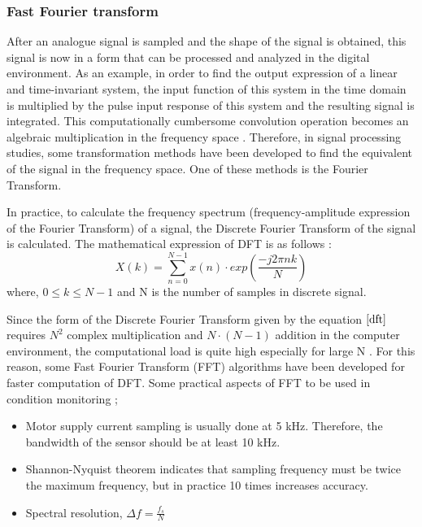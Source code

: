 \subsubsection{Fast Fourier transform}

After an analogue signal is sampled and the shape of the signal is obtained, this signal is now in a form that can be processed and analyzed in the digital environment. As an example, in order to find the output expression of a linear and time-invariant system, the input function of this system in the time domain is multiplied by the pulse input response of this system and the resulting signal is integrated. This computationally cumbersome convolution operation becomes an algebraic multiplication in the frequency space \cite{cernuda2019relevance}. Therefore, in signal processing studies, some transformation methods have been developed to find the equivalent of the signal in the frequency space. One of these methods is the Fourier Transform.

In practice, to calculate the frequency spectrum (frequency-amplitude expression of the Fourier Transform) of a signal, the Discrete Fourier Transform of the signal is calculated. The mathematical expression of DFT is as follows \cite{allen2004signal}:
\begin{equation}
X(k)= \displaystyle\sum_{n=0}^{N-1}x(n)\cdot exp\left({\frac{-j2\pi nk}{N}}\right)
\label{dft}
\end{equation}
where, $0 \leq k \leq N-1$ and N is the number of samples in discrete signal.

Since the form of the Discrete Fourier Transform given by the equation $\ref{dft}$ requires $N^2$ complex multiplication and $N\cdot (N-1)$ addition in the computer environment, the computational load is quite high especially for large N \cite{hayes2009statistical,orfanidis1995introduction,allen2004signal,randall2021vibration}. For this reason, some Fast Fourier Transform (FFT) algorithms have been developed for faster computation of DFT. Some practical aspects of FFT to be used in condition monitoring \cite{bonaldi2012predictive};

\begin{itemize}
	\item Motor supply current sampling is usually done at 5 kHz. Therefore, the bandwidth of the sensor should be at least 10 kHz.  
	\item Shannon-Nyquist theorem indicates that sampling frequency must be twice the maximum frequency, but in practice 10 times increases accuracy.
	\item Spectral resolution, $\Delta f = \displaystyle\frac{f_s}{N}$
\end{itemize}

